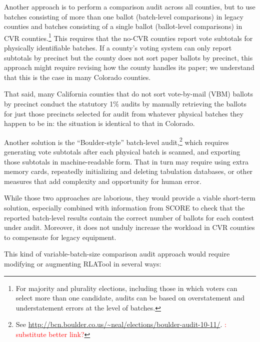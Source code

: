 \documentclass[12pt]{article}
\newcommand{\note}[1]{\textcolor{red}{\sc #1}}
\begin{document}
Another approach is to perform a comparison audit across all counties, but to use batches consisting
of more than one ballot (batch-level comparisons)
in legacy counties and batches consisting of a single ballot (ballot-level comparisons) in CVR counties.\footnote{%
 For majority and plurality elections, including those in which voters can select more than one candidate,
  audits can be based on overstatement and understatement errors at the level of batches.
}
This requires that the no-CVR counties report vote subtotals
for physically identifiable batches.
If a county's voting system can only report subtotals by precinct but 
the county does not sort paper ballots by
precinct, this approach might require revising how the county handles its
paper; we understand that this is the case in many Colorado counties.

That said, many California counties that do not sort vote-by-mail (VBM)
ballots by precinct conduct the statutory 1\% audits by manually retrieving the ballots 
for just those precincts selected for audit from whatever physical batches they happen to be in: 
the situation is identical to that in Colorado.

Another solution is the ``Boulder-style'' batch-level audit,\footnote{%
 See \url{http://bcn.boulder.co.us/~neal/elections/boulder-audit-10-11/}.
 \note{\@Neal: substitute better link?}
}
which requires generating 
vote subtotals after each physical batch is scanned, and exporting those subtotals in machine-readable form.
That in turn may require using extra memory cards, repeatedly initializing and deleting tabulation databases,
or other measures that add complexity and opportunity for human error.

While those two approaches are laborious, they would provide a viable short-term solution,
especially combined with information from SCORE to check that the reported batch-level results contain the correct number of ballots for each contest under audit.
Moreover, it does not unduly increase the workload in CVR counties
to compensate for legacy equipment.

This kind of variable-batch-size comparison audit approach would require modifying or augmenting
RLATool in several ways: 
\end{document}
